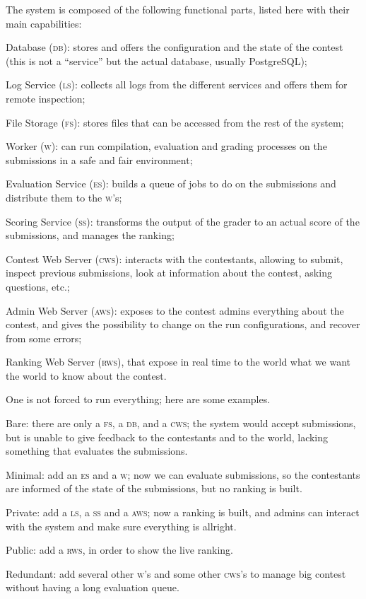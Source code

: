 \documentclass[a4paper,8pt]{amsart}
\newcommand{\DB}{\textsc{db}}
\newcommand{\LS}{\textsc{ls}}
\newcommand{\FS}{\textsc{fs}}
\newcommand{\ES}{\textsc{es}}
\newcommand{\WS}{\textsc{w}}
\renewcommand{\SS}{\textsc{ss}}
\newcommand{\CWS}{\textsc{cws}}
\newcommand{\AWS}{\textsc{aws}}
\newcommand{\RWS}{\textsc{rws}}
\newenvironment{squishlist}{%
  \begin{list}{\textbullet}%
    { \setlength{\itemsep}{0pt}%
      \setlength{\parsep}{3pt}%
      \setlength{\topsep}{3pt}%
      \setlength{\partopsep}{0pt}%
      \setlength{\leftmargin}{1.5em}%
      \setlength{\labelwidth}{1em}%
      \setlength{\labelsep}{0.5em} }%
}{\end{list}}
\begin{document}
\begin{multicols}{2}
  The system is composed of the following functional parts, listed
  here with their main capabilities:
  \begin{squishlist}
  \item Database (\DB{}): stores and offers the configuration and
    the state of the contest (this is not a ``service'' but the actual
    database, usually PostgreSQL);
  \item Log Service (\LS{}): collects all logs from the different
    services and offers them for remote inspection;
  \item File Storage (\FS{}): stores files that can be accessed from
    the rest of the system;
  \item Worker (\WS{}): can run compilation, evaluation and
    grading processes on the submissions in a safe and fair
    environment;
  \item Evaluation Service (\ES{}): builds a queue of jobs to do on the
    submissions and distribute them to the \WS{}'s;
  \item Scoring Service (\SS{}): transforms the output of the grader
    to an actual score of the submissions, and manages the ranking;
  \item Contest Web Server (\CWS{}): interacts with the contestants,
    allowing to submit, inspect previous submissions, look at
    information about the contest, asking questions, etc.;
  \item Admin Web Server (\AWS{}): exposes to the contest admins
    everything about the contest, and gives the possibility to change
    on the run configurations, and recover from some errors;
  \item Ranking Web Server (\RWS{}), that expose in real time to the
    world what we want the world to know about the contest.
  \end{squishlist}

  One is not forced to run everything; here are some examples.
  \begin{squishlist}
  \item Bare: there are only a \FS{}, a \DB{}, and a \CWS{}; the
    system would accept submissions, but is unable to give feedback to
    the contestants and to the world, lacking something that evaluates
    the submissions.
  \item Minimal: add an \ES{} and a \WS{}; now we can evaluate
    submissions, so the contestants are informed of the state of the
    submissions, but no ranking is built.
  \item Private: add a \LS{}, a \SS{} and a \AWS{}; now a ranking is
    built, and admins can interact with the system and make sure
    everything is allright.
  \item Public: add a \RWS{}, in order to show the live ranking.
  \item Redundant: add several other \WS{}'s and some other \CWS{}'s
    to manage big contest without having a long evaluation queue.
  \end{squishlist}


\end{multicols}
\end{document}
